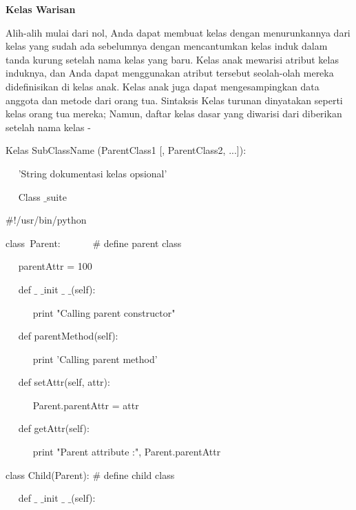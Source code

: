 \begin{12pt}
\begin{12pt}
\begin{12pt}
\begin{12pt}
\begin{12pt}
\begin{12pt}
\begin{12pt}
\begin{12pt}
\begin{12pt}
\begin{12pt}
\begin{12pt}
\begin{12pt}
\begin{12pt}
\begin{12pt}
\begin{12pt}
\begin{12pt}
\vspace{12pt}
\noindent 
{\fontsize{14pt}{14pt}\selectfont \textbf{Kelas Warisan} \\} \par
\vspace{12pt}
Alih-alih mulai dari nol, Anda dapat membuat kelas dengan menurunkannya dari kelas yang sudah ada sebelumnya dengan mencantumkan kelas induk dalam tanda kurung setelah nama kelas yang baru. Kelas anak mewarisi atribut kelas induknya, dan Anda dapat menggunakan atribut tersebut seolah-olah mereka didefinisikan di kelas anak. Kelas anak juga dapat mengesampingkan data anggota dan metode dari orang tua. Sintaksis Kelas turunan dinyatakan seperti kelas orang tua mereka; Namun, daftar kelas dasar yang diwarisi dari diberikan setelah nama kelas - \par
\vspace{12pt}
\noindent 
Kelas SubClassName (ParentClass1 [, ParentClass2, ...]): \par
\noindent 
~~ 'String dokumentasi kelas opsional' \par
\noindent 
~~ Class $  \_  $suite \par
\noindent 
 $  \#  $!/usr/bin/python \par
\vspace{12pt}
\noindent 
class~Parent:~~~~~~   $  \#  $ define parent class \par
\noindent 
~~ parentAttr = 100 \par
\noindent 
~~ def  $  \_  $ $  \_  $init $  \_  $ $  \_  $(self): \par
\noindent 
~~~~~ print "Calling parent constructor" \par
\vspace{12pt}
\noindent 
~~ def parentMethod(self): \par
\noindent 
~~~~~ print 'Calling parent method' \par
\vspace{12pt}
\noindent 
~~ def setAttr(self, attr): \par
\noindent 
~~~~~ Parent.parentAttr = attr \par
\vspace{12pt}
\noindent 
~~ def getAttr(self): \par
\noindent 
~~~~~ print "Parent attribute :", Parent.parentAttr \par
\vspace{12pt}
\noindent 
class Child(Parent):  $  \#  $ define child class \par
\noindent 
~~ def  $  \_  $ $  \_  $init $  \_  $ $  \_  $(self): \par

\end{12pt}
\end{12pt}
\end{12pt}
\end{12pt}
\end{12pt}
\end{12pt}
\end{12pt}
\end{12pt}
\end{12pt}
\end{12pt}
\end{12pt}
\end{12pt}
\end{12pt}
\end{12pt}
\end{12pt}
\end{12pt}
